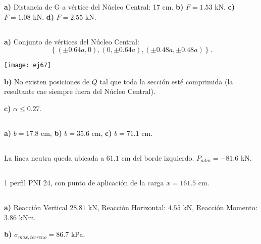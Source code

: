 \textbf{a)} Distancia de G a vértice del Núcleo Central: 17 cm. \textbf{b)} $F=1.53$ kN.
\textbf{c)}
$F=1.08$ kN.
\textbf{d)}
$F=2.55$ kN.

\subsection{}
\textbf{a)} Conjunto de vértices del Núcleo Central: $$
\left\{(\pm 0.64a,0), (0, \pm 0.64a), (\pm 0.48a,\pm 0.48a)\right\}.
$$

\begin{center}
	\texttt{[image: ej67]}
\end{center}

\textbf{b)}
No existen posiciones de $Q$ tal que toda la sección esté comprimida (la resultante cae siempre fuera del Núcleo Central).

\textbf{c)}
$\alpha \leq 0.27$.

\subsection{}
\textbf{a)} 
$b=17.8$ cm,
\textbf{b)} $b=35.6$ cm, \textbf{c)} $b=71.1$ cm.

\subsection{}

La línea neutra queda ubicada a $61.1$ cm del borde izquierdo. $P_{adm} = -81.6$ kN.

\subsection{}
1 perfil PNI 24, con punto de aplicación de la carga $x = 161.5$ cm.

\subsection{}
\textbf{a)}  Reacción Vertical $28.81$ kN, Reacción Horizontal: $4.55$ kN, Reacción Momento: $3.86$ kNm.

\textbf{b)} $\sigma_{max,terreno} = 86.7$ kPa.



\subsection{}

